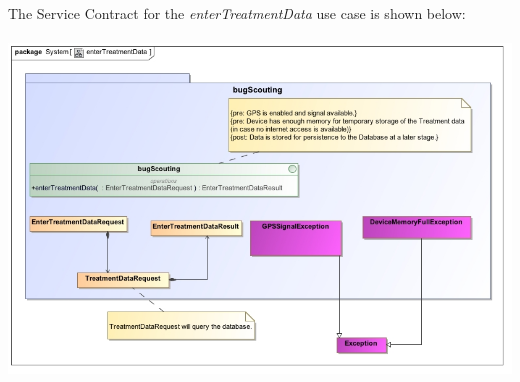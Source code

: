 \documentclass[11pt,a4paper,titlepage]{article}
\begin{document}
		The Service Contract for the \textit{enterTreatmentData} use case is shown below:\\\hfill\\
		\includegraphics[width=\linewidth]{EnterTreatmentData}
		
\end{document}
